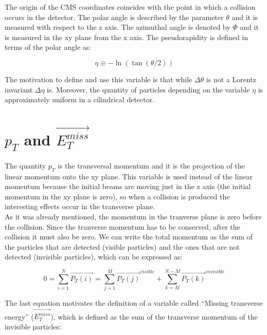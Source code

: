 The origin of the CMS coordinates coincides with the point in which a collision occurs in the detector. 
The polar angle is described by the parameter $\theta$ and it is measured with respect to the z axis.
The azimuthal angle is denoted by $\Phi$ and it is measured in the xy plane from the x axis. The pseudorapidity is defined in terms of the polar angle as:

\begin{equation}
 \eta \equiv - \ln \left( \tan (\theta /2 ) \right)
\end{equation}

 The motivation to define and use this variable is that while $\Delta \theta$ is not a Lorentz invariant $\Delta \eta$ is. Moreover, the quantity of particles depending on the variable $\eta$
 is approximately uniform in a cilindrical detector. 
 
  
 \section{$p_T$ and $\vec{E_T^{miss}}$}

 The quantity $p_T$ is the transversal momentum and it is the projection of the linear momentum onto the xy plane. This variable is used instead of the linear momentum because the initial beams
 are moving just in the z axis (the initial momentum in the xy plane is zero), so when a collision is produced the interesting effects occur in the transverse plane.\\
 
 As it was already mentioned, the momentum in the tranverse plane is zero before the collision. Since the tranverse momentum has to be conserved, after the collision it must also be zero. We can write
 the total momentum as the sum of the particles that are detected (visible particles) and the ones that are not detected (invisible particles), which can be expressed as:
 
 \begin{equation}
  0 = \sum_{i=1}^N \vec{P_T(i)} = \sum_{j=1}^M \vec{P_T(j)}^{visible} + \sum_{k=M}^{N-M} \vec{P_T(k)}^{invisible}
 \end{equation}


 The last equation motivates the definition of a variable called ``Missing transverse energy'' ($\vec{E_T^{miss}}$), which is defined as the sum of the transverse momentum of the invisible
 particles:
 
